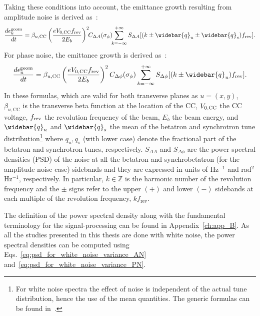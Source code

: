 Taking these conditions into account, the emittance growth resulting from amplitude noise is derived as~\cite{PhysRevSTAB.18.101001}:
\begin{equation}\label{eq:dey_an}
    \frac{d\epsilon^{\mathrm{geom}}_u}{dt}  = \beta_{u, \mathrm{CC}} \left( \frac{e\CCvoltage\frev}{2E_b}\right)^2 \!\! C_{\Delta A} (\sigma_{\phi}) \!\! \sum_{k=-\infty}^{+\infty} S_{\Delta A}[(k \pm \widebar{q}_u \pm \widebar{q}_s)\frev].
\end{equation}
For phase noise, the emittance growth is derived as~\cite{PhysRevSTAB.18.101001}:
\begin{equation}\label{eq:dey_pn}
    \frac{d\epsilon^{\mathrm{geom}}_u}{dt}  = \beta_{u, \mathrm{CC}}  \left( \frac{e\CCvoltage\frev}{2E_b}\right)^2 C_{\Delta \phi} (\sigma_{\phi}) \sum_{k=-\infty}^{+\infty} S_{\Delta \phi}[(k \pm \widebar{q}_u) \frev].
\end{equation}
In these formulas, which are valid for both transverse planes as $u=(x,y)$, $\beta_{u, \mathrm{CC}}$ is the transverse beta function at the location of the CC, ${V_\mathrm{0, CC}}$ the CC voltage, ${f_\mathrm{rev}}$ the revolution frequency of the beam, $E_b$ the beam energy, and $\widebar{q}_u$ and $\widebar{q}_s$ the mean of the betatron and synchrotron tune distribution\footnote{For white noise spectra the effect of noise is independent of the actual tune distribution, hence the use of the mean quantities. The generic formulas can be found in~\cite{PhysRevSTAB.18.101001}.} where $q_u, q_s$ (with lower case) denote the fractional part of the betatron and synchrotron tunes, respectively. $S_{\Delta A}$ and $S_{\Delta \phi}$ are the power spectral densities (PSD) of the noise at all the betatron and synchrobetatron (for the amplitude noise case) sidebands and they are expressed in units of Hz$^{-1}$ and rad$^2$Hz$^{-1}$, respectively. In particular, $k \in \mathbb{Z}$ is the harmonic number of the revolution frequency and the $\pm$ signs refer to the upper $(+)$ and lower $(-)$ sidebands at each multiple of the revolution frequency, $k f_\mathrm{rev}$.%

The definition of the power spectral density along with the fundamental terminology for the signal-processing can be found in Appendix~\ref{ch:app_B}. %
As all the studies presented in this thesis are done with white noise, the power spectral densities can be computed using Eqs.~\eqref{eq:psd_for_white_noise_variance_AN} and~\eqref{eq:psd_for_white_noise_variance_PN}.



